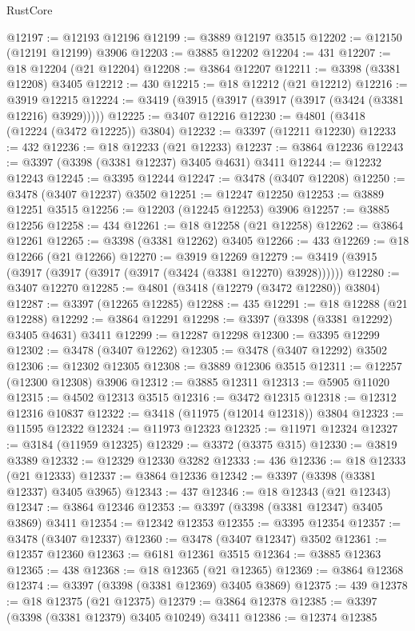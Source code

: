 \begin{lexlean}{RustCore}
\begin{coremodule}
@12197 := @12193 @12196
@12199 := @3889 @12197 @3515
@12202 := @12150 (@12191 @12199) @3906
@12203 := @3885 @12202
@12204 := 431
@12207 := @18 @12204 (@21 @12204)
@12208 := @3864 @12207
@12211 := @3398 (@3381 @12208) @3405
@12212 := 430
@12215 := @18 @12212 (@21 @12212)
@12216 := @3919 @12215
@12224 := @3419 (@3915 (@3917 (@3917 (@3917 (@3424 (@3381 @12216) @3929)))))
@12225 := @3407 @12216
@12230 := @4801 (@3418 (@12224 (@3472 @12225)) @3804)
@12232 := @3397 (@12211 @12230)
@12233 := 432
@12236 := @18 @12233 (@21 @12233)
@12237 := @3864 @12236
@12243 := @3397 (@3398 (@3381 @12237) @3405 @4631) @3411
@12244 := @12232 @12243
@12245 := @3395 @12244
@12247 := @3478 (@3407 @12208)
@12250 := @3478 (@3407 @12237) @3502
@12251 := @12247 @12250
@12253 := @3889 @12251 @3515
@12256 := @12203 (@12245 @12253) @3906
@12257 := @3885 @12256
@12258 := 434
@12261 := @18 @12258 (@21 @12258)
@12262 := @3864 @12261
@12265 := @3398 (@3381 @12262) @3405
@12266 := 433
@12269 := @18 @12266 (@21 @12266)
@12270 := @3919 @12269
@12279 := @3419 (@3915 (@3917 (@3917 (@3917 (@3917 (@3424 (@3381 @12270) @3928))))))
@12280 := @3407 @12270
@12285 := @4801 (@3418 (@12279 (@3472 @12280)) @3804)
@12287 := @3397 (@12265 @12285)
@12288 := 435
@12291 := @18 @12288 (@21 @12288)
@12292 := @3864 @12291
@12298 := @3397 (@3398 (@3381 @12292) @3405 @4631) @3411
@12299 := @12287 @12298
@12300 := @3395 @12299
@12302 := @3478 (@3407 @12262)
@12305 := @3478 (@3407 @12292) @3502
@12306 := @12302 @12305
@12308 := @3889 @12306 @3515
@12311 := @12257 (@12300 @12308) @3906
@12312 := @3885 @12311
@12313 := @5905 @11020
@12315 := @4502 @12313 @3515
@12316 := @3472 @12315
@12318 := @12312 @12316 @10837
@12322 := @3418 (@11975 (@12014 @12318)) @3804
@12323 := @11595 @12322
@12324 := @11973 @12323
@12325 := @11971 @12324
@12327 := @3184 (@11959 @12325)
@12329 := @3372 (@3375 @315)
@12330 := @3819 @3389
@12332 := @12329 @12330 @3282
@12333 := 436
@12336 := @18 @12333 (@21 @12333)
@12337 := @3864 @12336
@12342 := @3397 (@3398 (@3381 @12337) @3405 @3965)
@12343 := 437
@12346 := @18 @12343 (@21 @12343)
@12347 := @3864 @12346
@12353 := @3397 (@3398 (@3381 @12347) @3405 @3869) @3411
@12354 := @12342 @12353
@12355 := @3395 @12354
@12357 := @3478 (@3407 @12337)
@12360 := @3478 (@3407 @12347) @3502
@12361 := @12357 @12360
@12363 := @6181 @12361 @3515
@12364 := @3885 @12363
@12365 := 438
@12368 := @18 @12365 (@21 @12365)
@12369 := @3864 @12368
@12374 := @3397 (@3398 (@3381 @12369) @3405 @3869)
@12375 := 439
@12378 := @18 @12375 (@21 @12375)
@12379 := @3864 @12378
@12385 := @3397 (@3398 (@3381 @12379) @3405 @10249) @3411
@12386 := @12374 @12385

\end{coremodule}
\end{lexlean}
